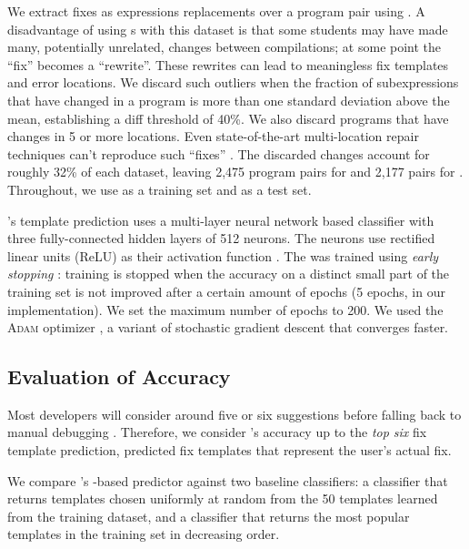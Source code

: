 %
We extract fixes as expressions replacements over a program pair using \diffsym.
A disadvantage of using \diffsym s with this dataset is that some students may have
made many, potentially unrelated, changes between compilations; at some point
the ``fix'' becomes a ``rewrite''. These rewrites can lead to
meaningless fix templates and error locations. We discard such outliers when the
fraction of subexpressions that have changed in a program is more than one
standard deviation above the mean, establishing a diff threshold of 40\%. We
also discard programs that have changes in 5 or more locations. Even
state-of-the-art multi-location repair techniques can't reproduce such ``fixes''
\citep{Saha_2019}. The discarded changes account for roughly 32\% of each
dataset, leaving 2,475 program pairs for \SPRING and 2,177 pairs for \FALL.
Throughout, we use \SPRING as a training set and \FALL as a test set.

%
\toolname's template prediction 
uses a multi-layer neural network \dnn based 
classifier with three fully-connected 
hidden layers of 512 neurons. The neurons use
rectified linear units (ReLU) as their activation 
function \citep{Nair2010-xg}.
%
The \dnn was trained using \emph{early stopping} 
\cite{Hastie2009-bn}: 
training is stopped when the accuracy on a distinct
small part of the training set is not improved after
a certain amount of epochs (5 epochs, in our implementation).
%
We set the maximum number of epochs to 200.
%
We used the \textsc{Adam} optimizer \citep{Kingma2014-ng},
a variant of stochastic gradient descent that converges faster.

\subsection{Evaluation of Accuracy}

\label{sec:eval:accuracy}

Most developers will consider around five or six suggestions before
falling back to manual debugging \citep{Kochhar2016-oc}. 
%
Therefore, we consider \toolname's accuracy up to the \emph{top six} 
fix template prediction, \ie predicted fix templates that represent 
the user's actual fix. 

%
We compare \toolname's \dnn-based predictor against two baseline 
classifiers: a \random classifier that returns 
templates 
chosen uniformly at random from the 50 templates 
learned from the \SPRING training dataset, and 
a \popular classifier that returns the most 
popular templates in the training set in 
decreasing order. 

